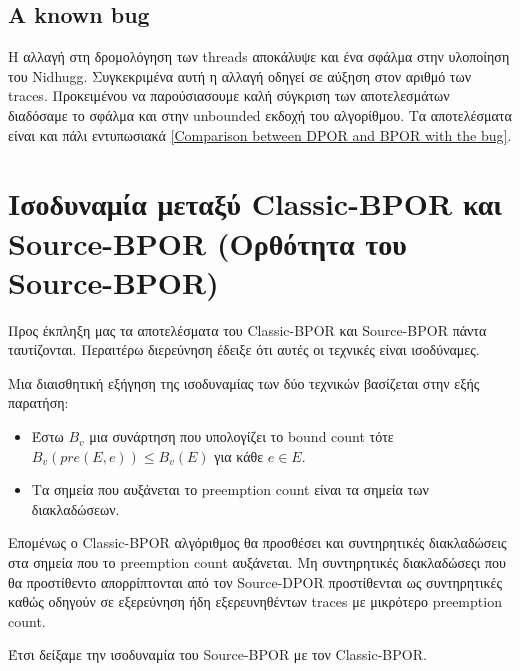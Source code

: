 \subsection{A known bug}
Η αλλαγή στη δρομολόγηση των threads αποκάλυψε και ένα σφάλμα στην υλοποίηση του Nidhugg. Συγκεκριμένα αυτή η αλλαγή οδηγεί
σε αύξηση στον αριθμό των traces. Προκειμένου να παρούσιασουμε καλή σύγκριση των αποτελεσμάτων διαδόσαμε το σφάλμα και στην unbounded εκδοχή 
του αλγορίθμου.
Τα αποτελέσματα είναι και πάλι εντυπωσιακά  \ref{Comparison between DPOR and BPOR with the bug}. 


\section{Ισοδυναμία μεταξύ Classic-BPOR και Source-BPOR (Ορθότητα του Source-BPOR)}
Προς έκπληξη μας τα αποτελέσματα του Classic-BPOR και Source-BPOR πάντα ταυτίζονται. Περαιτέρω διερεύνηση έδειξε ότι αυτές οι 
τεχνικές είναι ισοδύναμες.

Μια διαισθητική εξήγηση της ισοδυναμίας των δύο τεχνικών βασίζεται στην εξής παρατήση:
\begin{itemize}
  \item Έστω $B_v$ μια συνάρτηση που υπολογίζει το bound count τότε $B_v(pre(E,e)) \leq B_v(E)$ για κάθε $e \in E$.
  \item Τα σημεία που αυξάνεται το preemption count είναι τα σημεία των διακλαδώσεων.
\end{itemize}

Επομένως ο Classic-BPOR αλγόριθμος θα προσθέσει και συντηρητικές διακλαδώσεις στα σημεία που το preemption count αυξάνεται.
Μη συντηρητικές διακλαδώσεςι που θα προστίθεντο απορρίπτονται από τον Source-DPOR προστίθενται ως συντηρητικές καθώς οδηγούν σε
εξερεύνηση ήδη εξερευνηθέντων traces με μικρότερο preemption count.

Έτσι δείξαμε την ισοδυναμία του Source-BPOR με τον Classic-BPOR.
